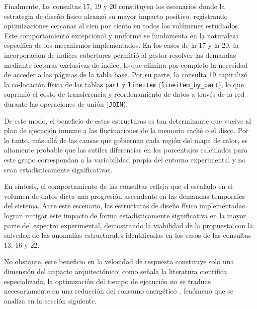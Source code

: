 \documentclass[12pt, letter paper]{report}
\begin{document}
        Finalmente, las consultas 17, 19 y 20 constituyen los escenarios donde
        la estrategia de diseño físico alcanzó su mayor impacto positivo,
        registrando optimizaciones cercanas al cien por ciento en todos los
        volúmenes estudiados. Este comportamiento excepcional y uniforme se
        fundamenta en la naturaleza específica de los mecanismos implementados.
        En los casos de la 17 y la 20, la incorporación de índices cobertores
        permitió al gestor resolver las demandas mediante lecturas exclusivas de
        índice, lo que elimina por completo la necesidad de acceder a las
        páginas de la tabla base. Por su parte, la consulta 19 capitalizó la
        co-locación física de las tablas \texttt{part} y \texttt{lineitem}
        (\texttt{lineitem\_by\_part}), lo que suprimió el costo de transferencia
        y reordenamiento de datos a través de la red durante las operaciones de
        unión (\texttt{JOIN}).

        De este modo, el beneficio de estas estructuras es tan determinante que
        vuelve al plan de ejecución inmune a las fluctuaciones de la memoria
        caché o el disco. Por lo tanto, más allá de las causas que gobiernan
        cada región del mapa de calor, es altamente probable que las sutiles
        diferencias en los porcentajes calculados para este grupo correspondan a
        la variabilidad propia del entorno experimental y no sean
        estadísticamente significativas.

        En síntesis, el comportamiento de las consultas refleja que el escalado
        en el volumen de datos dicta una progresión ascendente en las demandas
        temporales del sistema. Ante este escenario, las estructuras de diseño
        físico implementadas logran mitigar este impacto de forma
        estadísticamente significativa en la mayor parte del espectro
        experimental, demostrando la viabilidad de la propuesta con la salvedad
        de las anomalías estructurales identificadas en los casos de las
        consultas 13, 16 y 22.

        No obstante, este beneficio en la velocidad de respuesta constituye solo
        una  dimensión del impacto arquitectónico; como señala la literatura
        científica especializada, la optimización del tiempo de ejecución no se
        traduce necesariamente en una reducción del consumo energético
        \cite{langtowards2009, langrethinking2011, niemanndoes2013}, fenómeno
        que se analiza en la sección siguiente.
\end{document}
